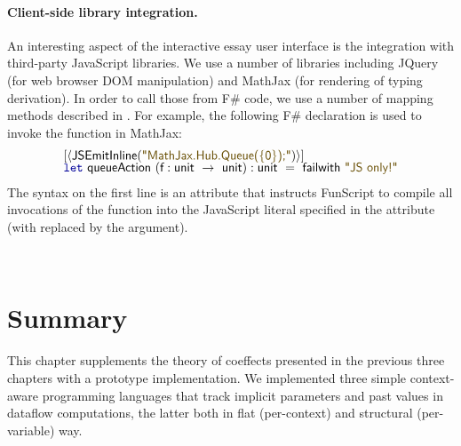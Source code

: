 \paragraph{Client-side library integration.} An interesting aspect of the interactive essay
user interface is the integration with third-party JavaScript libraries. We use a number of
libraries including JQuery (for web browser DOM manipulation) and MathJax \cite{essay-mathjax}
(for rendering of typing derivation). In order to call those from F\# code, we use a number
of mapping methods described in \cite{app-age-of-web}. For example, the following F\# declaration
is used to invoke the  function in MathJax:
%
\begin{equation*}
\begin{array}{l}
\lbrack\langle\ident{JSEmitInline}(\str{MathJax.Hub.Queue(\{0\});})\rangle\rbrack\\[-0.25em]
\kvd{let}~\ident{queueAction}~(\ident{f}:\ident{unit}~\rightarrow~\ident{unit}):\ident{unit}~=~\ident{failwith}~\str{JS only!}
\end{array}
\end{equation*}
%
The  syntax on the first line is an attribute that instructs FunScript
to compile all invocations of the  function into the JavaScript literal
specified in the attribute (with  replaced by the argument).


%
%

~

\section{Summary}

This chapter supplements the theory of coeffects presented in the previous three chapters with
a prototype implementation. We implemented three simple context-aware programming languages that
track implicit parameters and past values in dataflow computations, the latter both in flat
(per-context) and structural (per-variable) way.

